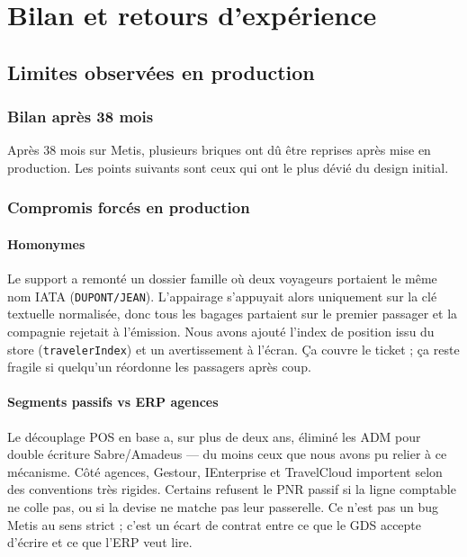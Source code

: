 \part{Bilan et retours d'expérience}
\label{part:demarche_reflexive}

\chapter{Limites observées en production}
\label{chap:reponse_problematique}

\section{Bilan après 38 mois}

\noindent Après 38 mois sur Metis, plusieurs briques ont dû être reprises après mise en production. Les points suivants sont ceux qui ont le plus dévié du design initial.

\section{Compromis forcés en production}

\subsection{Homonymes}

Le support a remonté un dossier famille où deux voyageurs portaient le même nom IATA (\texttt{DUPONT/JEAN}). L'appairage s'appuyait alors uniquement sur la clé textuelle normalisée, donc tous les bagages partaient sur le premier passager et la compagnie rejetait à l'émission. Nous avons ajouté l'index de position issu du store (\texttt{travelerIndex}) et un avertissement à l'écran. Ça couvre le ticket ; ça reste fragile si quelqu'un réordonne les passagers après coup.

\subsection{Segments passifs vs ERP agences}

Le découplage POS en base a, sur plus de deux ans, éliminé les ADM pour double écriture Sabre/Amadeus --- du moins ceux que nous avons pu relier à ce mécanisme. Côté agences, Gestour, IEnterprise et TravelCloud importent selon des conventions très rigides. Certains refusent le PNR passif si la ligne comptable ne colle pas, ou si la devise ne matche pas leur passerelle. Ce n'est pas un bug Metis au sens strict ; c'est un écart de contrat entre ce que le GDS accepte d'écrire et ce que l'ERP veut lire.


